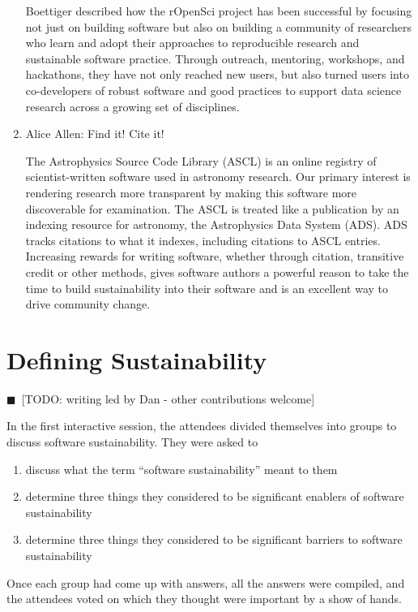 \documentclass[11pt, oneside]{amsart}
\newcommand{\todo}[1]{{\color{blue}$\blacksquare$~\textsf{[TODO: #1]}}}
\begin{document}
\begin{enumerate}
Boettiger described how the rOpenSci project has been successful by focusing not just on
building software but also on building a community of researchers who learn and adopt
their approaches to reproducible research and sustainable software practice.
Through outreach, mentoring, workshops, and hackathons, they have not only reached
new users, but also turned users into co-developers of robust software and good practices to
support data science research across a growing set of disciplines.


\item Alice Allen: Find it! Cite it!

The Astrophysics Source Code Library (ASCL) is an online registry of
scientist-written software used in astronomy research. Our primary interest is
rendering research more transparent by making this software more discoverable for
examination. The ASCL is treated like a publication by an indexing resource for
astronomy, the Astrophysics Data System (ADS). ADS tracks citations to what it
indexes, including citations to ASCL entries. Increasing rewards for writing
software, whether through citation, transitive credit or other methods, gives
software authors a powerful reason to take the time to build sustainability into
their software and is an excellent way to drive community change. 
\begin{comment}The ASCL
actively looks for opportunities to use change management strategies to move
astronomy to a more transparent discipline; these strategies can be used in
other disciplines to further change in them. 
\end{comment}
\end{enumerate}
 
 

\section{Defining Sustainability} \label{sec:defining}

\todo{writing led by Dan - other contributions welcome}

In the first interactive session, the attendees divided themselves into groups
to discuss software sustainability. They were asked to
\begin{enumerate}
\item discuss what the term ``software sustainability'' meant to them

\item determine three things they considered to be significant enablers of
software sustainability

\item determine three things they considered to be significant barriers to
software sustainability
\end{enumerate}
Once each group had come up with answers, all the answers were compiled, and the
attendees voted on which they thought were important by a show of hands.
\end{document}
